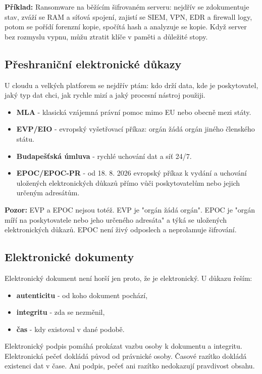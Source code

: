 \documentclass[11pt,a4paper]{article}
\newcommand{\pozor}[1]{\begin{tcolorbox}[breakable,enhanced,colback=red!7,colframe=red!30!black,boxrule=0pt,arc=1mm,left=5pt,right=5pt,top=5pt,bottom=5pt,before skip=6pt,after skip=6pt]\textbf{Pozor:} #1\end{tcolorbox}}
\newcommand{\priklad}[1]{\begin{tcolorbox}[breakable,enhanced,colback=green!7,colframe=green!30!black,boxrule=0pt,arc=1mm,left=5pt,right=5pt,top=5pt,bottom=5pt,before skip=6pt,after skip=6pt]\textbf{Příklad:} #1\end{tcolorbox}}
\begin{document}
\priklad{Ransomware na běžícím šifrovaném serveru: nejdřív se zdokumentuje stav, zváží se RAM a síťová spojení, zajistí se SIEM, VPN, EDR a firewall logy, potom se pořídí forenzní kopie, spočítá hash a analyzuje se kopie. Když server bez rozmyslu vypnu, můžu ztratit klíče v paměti a důležité stopy.}

\subsection*{Přeshraniční elektronické důkazy}
U cloudu a velkých platforem se nejdřív ptám: kdo drží data, kde je poskytovatel, jaký typ dat chci, jak rychle mizí a jaký procesní nástroj použiji.

\begin{itemize}
  \item \textbf{MLA} - klasická vzájemná právní pomoc mimo EU nebo obecně mezi státy.
  \item \textbf{EVP/EIO} - evropský vyšetřovací příkaz: orgán žádá orgán jiného členského státu.
  \item \textbf{Budapešťská úmluva} - rychlé uchování dat a síť 24/7.
  \item \textbf{EPOC/EPOC-PR} - od 18. 8. 2026 evropský příkaz k vydání a uchování uložených elektronických důkazů přímo vůči poskytovatelům nebo jejich určeným adresátům.
\end{itemize}

\pozor{EVP a EPOC nejsou totéž. EVP je "orgán žádá orgán". EPOC je "orgán míří na poskytovatele nebo jeho určeného adresáta" a týká se uložených elektronických důkazů. EPOC není živý odposlech a neprolamuje šifrování.}

\subsection*{Elektronické dokumenty}
Elektronický dokument není horší jen proto, že je elektronický. U důkazu řeším:
\begin{itemize}
  \item \textbf{autenticitu} - od koho dokument pochází,
  \item \textbf{integritu} - zda se nezměnil,
  \item \textbf{čas} - kdy existoval v dané podobě.
\end{itemize}

Elektronický podpis pomáhá prokázat vazbu osoby k dokumentu a integritu. Elektronická pečeť dokládá původ od právnické osoby. Časové razítko dokládá existenci dat v čase. Ani podpis, pečeť ani razítko nedokazují pravdivost obsahu.
\end{document}
